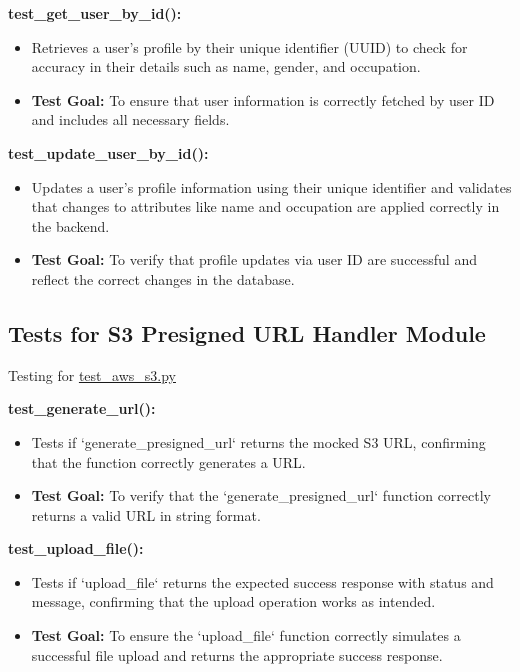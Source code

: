 \documentclass[12pt, titlepage]{article}
\begin{document}
\begin{enumerate}
\textbf{test\_get\_user\_by\_id():}  
\begin{itemize}
    \item Retrieves a user's profile by their unique identifier (UUID) to check for accuracy in their details such as name, gender, and occupation.
    \item \textbf{Test Goal:} To ensure that user information is correctly fetched by user ID and includes all necessary fields. 
    \newline
\end{itemize}

\textbf{test\_update\_user\_by\_id():}  
\begin{itemize}
    \item Updates a user's profile information using their unique identifier and validates that changes to attributes like name and occupation are applied correctly in the backend.
    \item \textbf{Test Goal:} To verify that profile updates via user ID are successful and reflect the correct changes in the database. 
    \newline
\end{itemize}


\subsection{Tests for S3 Presigned URL Handler Module}
Testing for \href{https://github.com/RezaJodeiri/CXR-Capstone/blob/main/src/backend/test/test_aws_s3.py}{test\_aws\_s3.py}

\textbf{test\_generate\_url():}  
\begin{itemize}
    \item Tests if `generate\_presigned\_url` returns the mocked S3 URL, confirming that the function correctly generates a URL.
    \item \textbf{Test Goal:} To verify that the `generate\_presigned\_url` function correctly returns a valid URL in string format.
    \newline
    \newline
\end{itemize}

\textbf{test\_upload\_file():}  
\begin{itemize}
    \item Tests if `upload\_file` returns the expected success response with status and message, confirming that the upload operation works as intended.
    \item \textbf{Test Goal:} To ensure the `upload\_file` function correctly simulates a successful file upload and returns the appropriate success response.
    \newline
\end{itemize}



\end{enumerate}
\end{document}
